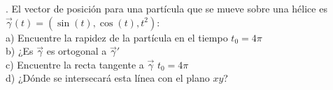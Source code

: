 \documentclass[letterpaper]{article}
\renewcommand{\*}{\cdot}
\theoremstyle{definition}
\begin{document}
. El vector de posición para una partícula que se mueve sobre una hélice es $\vec{\gamma}(t) = (\sin(t), \cos(t), t^2)$:\\


\noindent a) Encuentre la rapidez de la partícula en el tiempo  $t_0 = 4\pi$\\

\noindent b) ¿Es $\vec{\gamma}$ es ortogonal a  $\vec{\gamma}'$\\

\noindent c) Encuentre la recta tangente a $\vec{\gamma}$ $t_0 = 4\pi$\\

\noindent d) ¿Dónde se intersecará esta línea con el plano $xy$?\\
\end{document}
